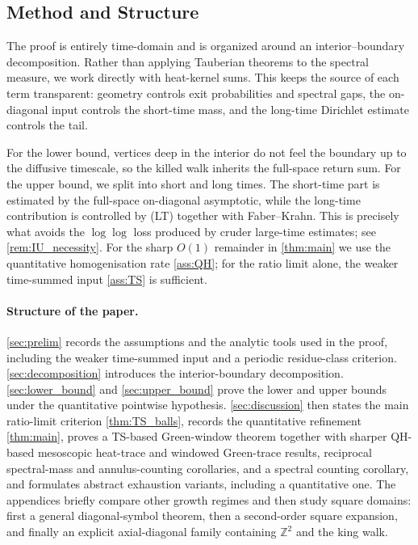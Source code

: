 \documentclass[reqno]{amsart}
\numberwithin{equation}{section}
\theoremstyle{definition}
\theoremstyle{remark}
\newcommand{\Cref}[1]{\autoref{#1}}
\begin{document}
\subsection{Method and Structure}

The proof is entirely time-domain and is organized around an interior--boundary decomposition. Rather than applying Tauberian theorems to the spectral measure, we work directly with heat-kernel sums. This keeps the source of each term transparent: geometry controls exit probabilities and spectral gaps, the on-diagonal input controls the short-time mass, and the long-time Dirichlet estimate controls the tail.

For the lower bound, vertices deep in the interior do not feel the boundary up to the diffusive timescale, so the killed walk inherits the full-space return sum. For the upper bound, we split into short and long times. The short-time part is estimated by the full-space on-diagonal asymptotic, while the long-time contribution is controlled by \textup{(LT)} together with Faber--Krahn. This is precisely what avoids the $\log\log$ loss produced by cruder large-time estimates; see \Cref{rem:IU_necessity}. For the sharp $O(1)$ remainder in \Cref{thm:main} we use the quantitative homogenisation rate \Cref{ass:QH}; for the ratio limit alone, the weaker time-summed input \Cref{ass:TS} is sufficient.

\paragraph{Structure of the paper.}
\Cref{sec:prelim} records the assumptions and the analytic tools used in the proof, including the weaker time-summed input and a periodic residue-class criterion. \Cref{sec:decomposition} introduces the interior-boundary decomposition. \Cref{sec:lower_bound} and \Cref{sec:upper_bound} prove the lower and upper bounds under the quantitative pointwise hypothesis. \Cref{sec:discussion} then states the main ratio-limit criterion \Cref{thm:TS_balls}, records the quantitative refinement \Cref{thm:main}, proves a TS-based Green-window theorem together with sharper QH-based mesoscopic heat-trace and windowed Green-trace results, reciprocal spectral-mass and annulus-counting corollaries, and a spectral counting corollary, and formulates abstract exhaustion variants, including a quantitative one. The appendices briefly compare other growth regimes and then study square domains: first a general diagonal-symbol theorem, then a second-order square expansion, and finally an explicit axial-diagonal family containing $\mathbb Z^2$ and the king walk.
\end{document}
